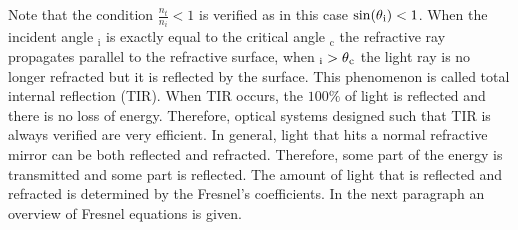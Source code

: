 Note that the condition $\frac{n_t}{n_i}<1$ is verified as in this case $\sin(\mbox{$\theta$}_\textrm{i})<1$.
When the incident angle \myangle$_{\textrm{i}}$ is exactly equal to the critical angle \myangle$_{\textrm{c}}$ the refractive ray propagates parallel to the refractive surface, 
when \myangle$_{\textrm{i}}>\mbox{$\theta$}_{\textrm{c}}$ the light ray is no longer refracted but it is reflected by the surface. This phenomenon is called total internal reflection (TIR). When TIR occurs, the $100\%$ of light is reflected and there is no loss of energy. Therefore, optical systems designed such that TIR is always verified are very efficient. In general, light that hits a normal refractive mirror can be both reflected and refracted. Therefore, some part of the energy is transmitted and some part is reflected. The amount of light that is reflected and refracted is determined by the Fresnel's coefficients.
In the next paragraph an overview of  Fresnel equations is given.

